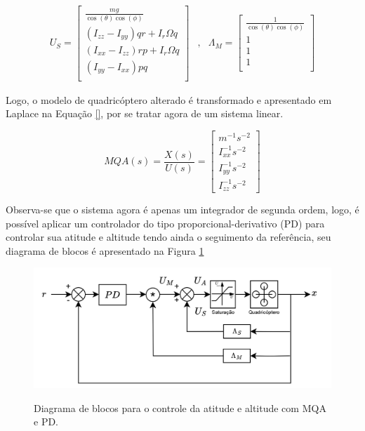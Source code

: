 \documentclass[main.tex]{subfiles}
\begin{document}
\textcolor{att}{
\begin{equation}
    \begin{matrix}
        U_S = 
        \begin{bmatrix}
            \frac{mg}{\cos{(\theta)}\cos{(\phi)}}\\
            (I_{zz} - I_{yy})qr + I_r\Omega q\\
            (I_{xx} - I_{zz})rp + I_r\Omega q\\
            (I_{yy} - I_{xx})pq\\
        \end{bmatrix}
        &,&
        \Lambda_{M} = 
        \begin{bmatrix}
            \frac{1}{\cos{(\theta)}\cos{(\phi)}}\\
            1\\
            1\\
            1\\
        \end{bmatrix}
    \end{matrix}
\end{equation}
}

\textcolor{att}{
Logo, o modelo de quadricóptero alterado é transformado e apresentado em Laplace na Equação \ref{}, por se tratar agora de um sistema linear.
}

\textcolor{att}{
\begin{equation}
    MQA(s) = \frac{X(s)}{U(s)} = 
    \begin{bmatrix}
        m^{-1}s^{-2}\\
        I_{xx}^{-1}s^{-2}\\
        I_{yy}^{-1}s^{-2}\\
        I_{zz}^{-1}s^{-2}
    \end{bmatrix}
\end{equation}
}

\textcolor{att}{
Observa-se que o sistema agora é apenas um integrador de segunda ordem, logo, é possível aplicar um controlador do tipo proporcional-derivativo (PD) para controlar sua atitude e altitude tendo ainda o seguimento da referência, seu diagrama de blocos é apresentado na Figura \ref{fig:controle_atitude_rle}
}

\begin{figure}[!h]
    \centering
    \caption{Diagrama de blocos para o controle da atitude e altitude com MQA e PD.}
    \includegraphics[width=1\textwidth]{capitulos/controle_atitude/imgs/controle_atitude.png}
    \label{fig:controle_atitude_rle}
\end{figure}
\end{document}
